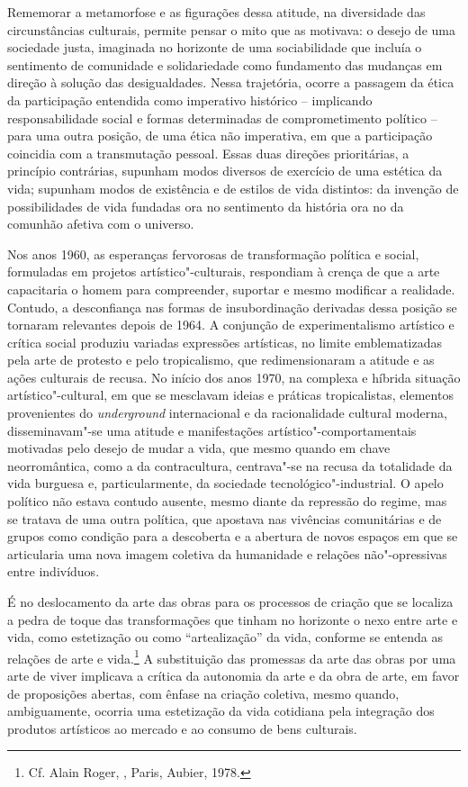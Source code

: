 Rememorar a metamorfose e as figurações dessa atitude, na diversidade
das circunstâncias culturais, permite pensar o mito que as motivava: o
desejo de uma sociedade justa, imaginada no horizonte de uma
sociabilidade que incluía o sentimento de comunidade e solidariedade
como fundamento das mudanças em direção à solução das desigualdades.
Nessa trajetória, ocorre a passagem da ética da participação entendida
como imperativo histórico -- implicando responsabilidade social e formas
determinadas de comprometimento político -- para uma outra posição, de
uma ética não imperativa, em que a participação coincidia com a
transmutação pessoal. Essas duas direções prioritárias, a princípio
contrárias, supunham modos diversos de exercício de uma estética da
vida; supunham modos de existência e de estilos de vida distintos: da
invenção de possibilidades de vida fundadas ora no sentimento da
história ora no da comunhão afetiva com o universo.

Nos anos 1960, as esperanças fervorosas de transformação política e
social, formuladas em projetos artístico"-culturais, respondiam à crença
de que a arte capacitaria o homem para compreender, suportar e mesmo
modificar a realidade. Contudo, a desconfiança nas formas de
insubordinação derivadas dessa posição se tornaram relevantes depois de
1964. A conjunção de experimentalismo artístico e crítica social
produziu variadas expressões artísticas, no limite emblematizadas pela
arte de protesto e pelo tropicalismo, que redimensionaram a atitude e as
ações culturais de recusa. No início dos anos 1970, na complexa e
híbrida situação artístico"-cultural, em que se mesclavam ideias e
práticas tropicalistas, elementos provenientes do \emph{underground}
internacional e da racionalidade cultural moderna, disseminavam"-se uma
atitude e manifestações artístico"-comportamentais motivadas pelo desejo
de mudar a vida, que mesmo quando em chave neorromântica, como a da
contracultura, centrava"-se na recusa da totalidade da vida burguesa e,
particularmente, da sociedade tecnológico"-industrial. O apelo político
não estava contudo ausente, mesmo diante da repressão do regime, mas se
tratava de uma outra política, que apostava nas vivências comunitárias e
de grupos como condição para a descoberta e a abertura de novos espaços
em que se articularia uma nova imagem coletiva da humanidade e relações
não"-opressivas entre indivíduos.

É no deslocamento da arte das obras para os processos de criação que se
localiza a pedra de toque das transformações que tinham no horizonte o
nexo entre arte e vida, como estetização ou como ``artealização'' da
vida, conforme se entenda as relações de arte e vida.\footnote{Cf. Alain
Roger, {}, Paris, Aubier, 1978.}
A substituição das promessas da arte das obras
por uma arte de viver implicava a crítica da autonomia da arte e da obra
de arte, em favor de proposições abertas, com ênfase na criação
coletiva, mesmo quando, ambiguamente, ocorria uma estetização da vida
cotidiana pela integração dos produtos artísticos ao mercado e ao
consumo de bens culturais.


